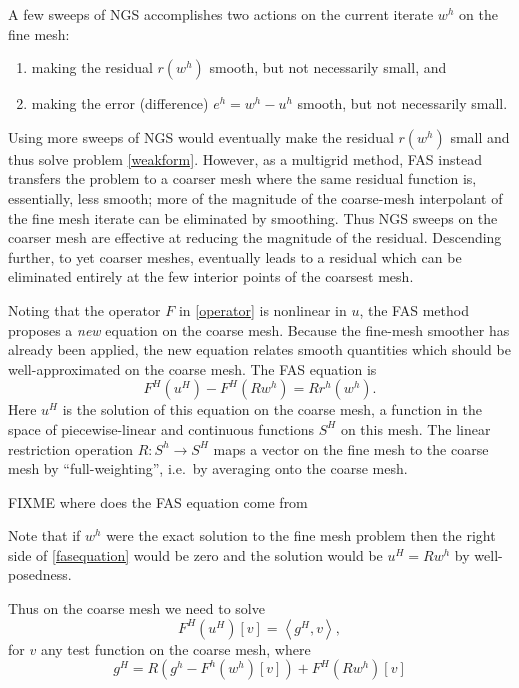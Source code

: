 \documentclass[letterpaper,final,12pt,reqno]{amsart}
\newcommand{\ip}[2]{\left<#1,#2\right>}
\begin{document}
A few sweeps of NGS accomplishes two actions on the current iterate $w^h$ on the fine mesh:
\renewcommand{\labelenumi}{\emph{\roman{enumi})}}
\begin{enumerate}
\item making the residual $r(w^h)$ smooth, but not necessarily small, and
\item making the error (difference) $e^h = w^h - u^h$ smooth, but not necessarily small.
\end{enumerate}
Using more sweeps of NGS would eventually make the residual $r(w^h)$ small and thus solve problem \eqref{weakform}.  However, as a multigrid method, FAS instead transfers the problem to a coarser mesh where the same residual function is, essentially, less smooth; more of the magnitude of the coarse-mesh interpolant of the fine mesh iterate can be eliminated by smoothing.  Thus NGS sweeps on the coarser mesh are effective at reducing the magnitude of the residual.  Descending further, to yet coarser meshes, eventually leads to a residual which can be eliminated entirely at the few interior points of the coarsest mesh.

Noting that the operator $F$ in \eqref{operator} is nonlinear in $u$, the FAS method  proposes a \emph{new} equation on the coarse mesh.  Because the fine-mesh smoother has already been applied, the new equation relates smooth quantities which should be well-approximated on the coarse mesh.  The FAS equation is
\begin{equation}
  F^H(u^H) - F^H(R w^h) = R r^h(w^h). \label{fasequation}
\end{equation}
Here $u^H$ is the solution of this equation on the coarse mesh, a function in the space of piecewise-linear and continuous functions $S^H$ on this mesh.  The linear restriction operation $R:S^h \to S^H$ maps a vector on the fine mesh to the coarse mesh by ``full-weighting'', i.e.~by averaging onto the coarse mesh.

FIXME where does the FAS equation come from

Note that if $w^h$ were the exact solution to the fine mesh problem then the right side of \eqref{fasequation} would be zero and the solution would be $u^H = R w^h$ by well-posedness.

Thus on the coarse mesh we need to solve
\begin{equation}
  F^H(u^H)[v] = \ip{g^H}{v},  \label{weakformcoarse}
\end{equation}
for $v$ any test function on the coarse mesh, where
  $$g^H = R (g^h - F^h(w^h)[v]) + F^H(R w^h)[v]$$
\end{document}
